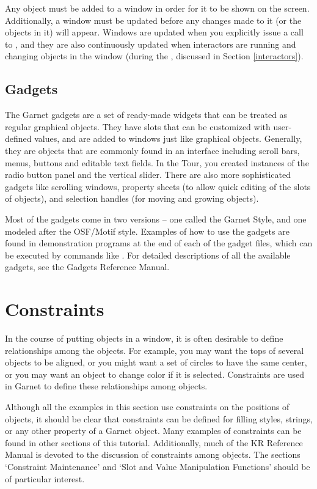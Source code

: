 Any object must be added to a window in order for it to be shown on
the screen.  Additionally, a window must be updated before any changes
made to it (or the objects in it) will appear.  Windows are updated
when you explicitly issue a call to , and they are
also continuously updated when interactors are running and changing
objects in the window (during the , discussed in
Section \ref{interactors}).


\section{Gadgets}

The Garnet gadgets are a set of ready-made widgets that can be treated
as regular graphical objects.  They have slots that can be customized
with user-defined values, and are added to windows just like graphical
objects.  Generally, they are objects that are
commonly found in an interface including scroll bars, menus, buttons
and editable text fields.  In the Tour, you created instances of the
radio button panel and the vertical slider.  There are also more
sophisticated gadgets like scrolling windows, property sheets (to
allow quick editing of the slots of objects), and selection handles
(for moving and growing objects).

Most of the gadgets come in two versions -- one called the Garnet
Style, and one modeled after the OSF/Motif style.  Examples of how to
use the gadgets are found in demonstration programs at the end of each
of the gadget files, which can be executed by commands like
.  For detailed descriptions of all the
available gadgets, see the Gadgets Reference Manual.



\chapter{Constraints}
\label{constraints}

In the course of putting objects in a window, it is often desirable to
define relationships among the objects.  For example, you may want
the tops of several objects to be aligned, or you might want a set of
circles to have the same center, or you may want an object to change
color if it is selected.  Constraints are used in Garnet to define
these relationships among objects.

Although all the examples in this section use constraints on the
positions of objects, it should be clear that constraints can be
defined for filling styles, strings, or any other property of a Garnet
object.  Many examples of constraints can be found in other sections
of this tutorial.  Additionally, much of the KR Reference Manual is
devoted to the discussion of constraints among objects.  The sections
`Constraint Maintenance' and `Slot and Value Manipulation Functions'
should be of particular interest.


